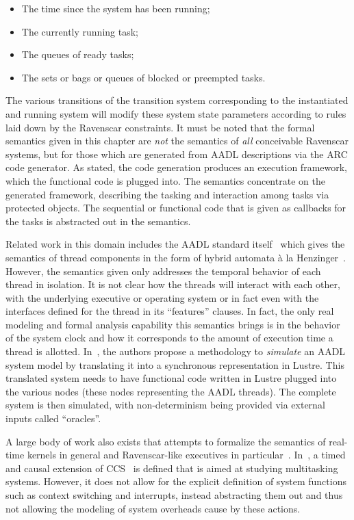 \begin{itemize}
\item{The time since the system has been running;}
\item{The currently running task;}
\item{The queues of ready tasks;}
\item{The sets or bags or queues of blocked or preempted tasks.}
\end{itemize}

The various transitions of the transition system corresponding to the
instantiated and running system will modify these system state
parameters according to rules laid down by the Ravenscar
constraints. It must be noted that the formal semantics given in this
chapter are \emph{not} the semantics of \emph{all} conceivable
Ravenscar systems, but for those which are generated from AADL
descriptions via the ARC code generator. As stated, the code
generation produces an execution framework, which the functional code
is plugged into. The semantics concentrate on the generated framework,
describing the tasking and interaction among tasks via protected
objects. The sequential or functional code that is given as callbacks
for the tasks is abstracted out in the semantics.

Related work in this domain includes the AADL standard
itself~\cite{AS5506} which gives the semantics of thread components in
the form of hybrid automata \`a la
Henzinger~\cite{henzinger@slcs96}. However, the semantics given only
addresses the temporal behavior of each thread in isolation. It is not
clear how the threads will interact with each other, with the
underlying executive or operating system or in fact even with the
interfaces defined for the thread in its ``features'' clauses. In
fact, the only real modeling and formal analysis capability this
semantics brings is in the behavior of the system clock and how it
corresponds to the amount of execution time a thread is
allotted. In~\cite{halbwachs@emsoft07}, the authors propose a
methodology to \emph{simulate} an AADL system model by translating it
into a synchronous representation in Lustre. This translated system
needs to have functional code written in Lustre plugged into the
various nodes (these nodes representing the AADL threads). The
complete system is then simulated, with non-determinism being provided
via external inputs called ``oracles''.

A large body of work also exists that attempts to formalize the
semantics of real-time kernels in general and Ravenscar-like
executives in particular~\cite{fowler@rtss97, lundqvist@rtcsa99,
  vardanega@rts05, fidge@amast00}. In~\cite{fidge@amast00}, a timed
and causal extension of CCS~\cite{milner-cc} is defined that is aimed
at studying multitasking systems. However, it does not allow for the
explicit definition of system functions such as context switching and
interrupts, instead abstracting them out and thus not allowing the
modeling of system overheads cause by these actions.

